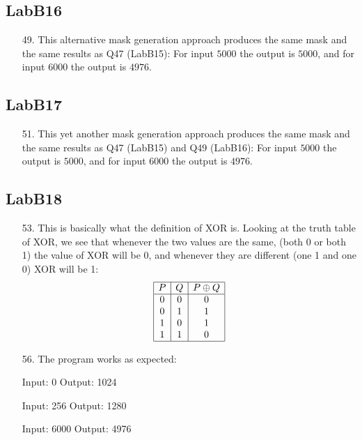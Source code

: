 \documentclass{article}
\begin{document}
\subsection{LabB16}
\begin{enumerate}
\item[49. ] This alternative mask generation approach produces the same mask and the same results as Q47 (LabB15): For input $5000$ the output is $5000$, and for input $6000$ the output is $4976$.

\end{enumerate}

\subsection{LabB17}
\begin{enumerate}
\item[51. ] This yet another mask generation approach produces the same mask and the same results as Q47 (LabB15) and Q49 (LabB16): For input $5000$ the output is $5000$, and for input $6000$ the output is $4976$.

\end{enumerate}

\subsection{LabB18}
\begin{enumerate}
\item[53. ] This is basically what the definition of XOR is. Looking at the truth table of XOR, we see that whenever the two values are the same, (both 0 or both 1) the value of XOR will be 0, and whenever they are different (one 1 and one 0) XOR will be 1:
\begin{displaymath}
\begin{array}{|c|c|c|}
\hline
   P
 & Q
 & P \oplus Q \\
\hline
0 & 0 & 0 \\
0 & 1 & 1 \\
1 & 0 & 1 \\
1 & 1 & 0 \\
\hline
\end{array}
\end{displaymath}

\item[56. ] The program works as expected:\newline

Input: 0 \newline
Output: 1024
\newline

Input: 256 \newline
Output: 1280
\newline

Input: 6000 \newline
Output: 4976

\end{enumerate}
\end{document}
